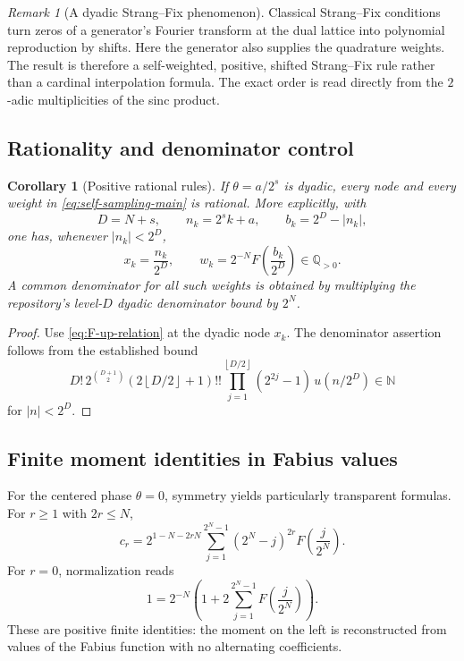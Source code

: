 \documentclass[11pt]{article}
\numberwithin{equation}{section}
\newtheorem{corollary}[theorem]{Corollary}
\theoremstyle{definition}
\theoremstyle{remark}
\newtheorem{remark}[theorem]{Remark}
\newcommand{\Q}{\mathbb Q}
\newcommand{\N}{\mathbb N}
\newcommand{\floor}[1]{\left\lfloor#1\right\rfloor}
\newcommand{\abs}[1]{\left|#1\right|}
\begin{document}
\begin{remark}[A dyadic Strang--Fix phenomenon]
Classical Strang--Fix conditions turn zeros of a generator's Fourier transform at the dual lattice into polynomial reproduction by shifts.  Here the generator also supplies the quadrature weights.  The result is therefore a self-weighted, positive, shifted Strang--Fix rule rather than a cardinal interpolation formula.  The exact order is read directly from the $2$-adic multiplicities of the sinc product.
\end{remark}

\subsection{Rationality and denominator control}

\begin{corollary}[Positive rational rules]
\label{cor:rational-rules}
If $\theta=a/2^s$ is dyadic, every node and every weight in \eqref{eq:self-sampling-main} is rational.  More explicitly, with
\[
 D=N+s,
 \qquad n_k=2^sk+a,
 \qquad b_k=2^D-\abs{n_k},
\]
one has, whenever $\abs{n_k}<2^D$,
\begin{equation}
 x_k=\frac{n_k}{2^D},
 \qquad
 w_k=2^{-N}F\!\left(\frac{b_k}{2^D}\right)\in\Q_{>0}.
 \label{eq:rational-weights}
\end{equation}
A common denominator for all such weights is obtained by multiplying the repository's level-$D$ dyadic denominator bound by $2^N$.
\end{corollary}

\begin{proof}
Use \eqref{eq:F-up-relation} at the dyadic node $x_k$.  The denominator assertion follows from the established bound
\[
 D!\,2^{\binom{D+1}{2}}(2\floor{D/2}+1)!!
 \prod_{j=1}^{\floor{D/2}}(2^{2j}-1)\,u(n/2^D)\in\N
\]
for $\abs n<2^D$.
\end{proof}

\subsection{Finite moment identities in Fabius values}

For the centered phase $\theta=0$, symmetry yields particularly transparent formulas.  For $r\ge1$ with $2r\le N$,
\begin{equation}
 \boxed{\displaystyle
 c_r=2^{1-N-2rN}
 \sum_{j=1}^{2^N-1}(2^N-j)^{2r}
 F\!\left(\frac j{2^N}\right).}
 \label{eq:centered-moment-F}
\end{equation}
For $r=0$, normalization reads
\begin{equation}
 1=2^{-N}\left(1+2\sum_{j=1}^{2^N-1}F\!\left(\frac j{2^N}\right)\right).
 \label{eq:centered-normalization-F}
\end{equation}
These are positive finite identities: the moment on the left is reconstructed from values of the Fabius function with no alternating coefficients.
\end{document}
